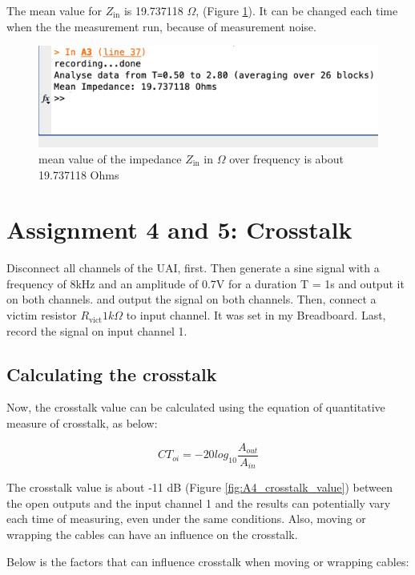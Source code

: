 \documentclass[
	a4paper,
	11pt,
]{article}
\begin{document}
The mean value for \(Z_\text{in}\) is 19.737118 \(\Omega\), (Figure \ref{fig:A3_Zin_mean_value}). It can be changed each time when the the measurement run, because of measurement noise.

\begin{figure}[htb!]
    \centerline{\includegraphics[width=14cm]{figure/A3/Zin_mean.jpg}}
    \caption{mean value of the impedance \(Z_\text{in}\) in \(\Omega\) over frequency is about 19.737118 Ohms}
    \label{fig:A3_Zin_mean_value}
\end{figure}

\section{Assignment 4 and 5: Crosstalk}
Disconnect all channels of the UAI, first. Then generate a sine signal with a frequency of 8kHz and an amplitude
of 0.7V for a duration T = 1s and output it on both channels. and output the signal on both channels. Then, connect a victim resistor \(R_\text{vict}1 k \Omega\) to input channel. It was set in my Breadboard. Last, record the signal on input channel 1. 

\subsection{Calculating the crosstalk}
Now, the crosstalk value can be calculated using the equation of quantitative measure of crosstalk, as below:

\begin{equation}
    CT_{oi} = -20 log_{10} \frac{A_{out}}{A_{in}}
\end{equation}

The crosstalk value is about -11 dB (Figure \ref{fig:A4_crosstalk_value}) between the open outputs and the input channel 1 and the results can potentially vary each time of measuring, even under the same conditions. 
Also,  moving or wrapping the cables can have an influence on the crosstalk. 

Below is the factors that can influence crosstalk when moving or wrapping cables:
\end{document}
